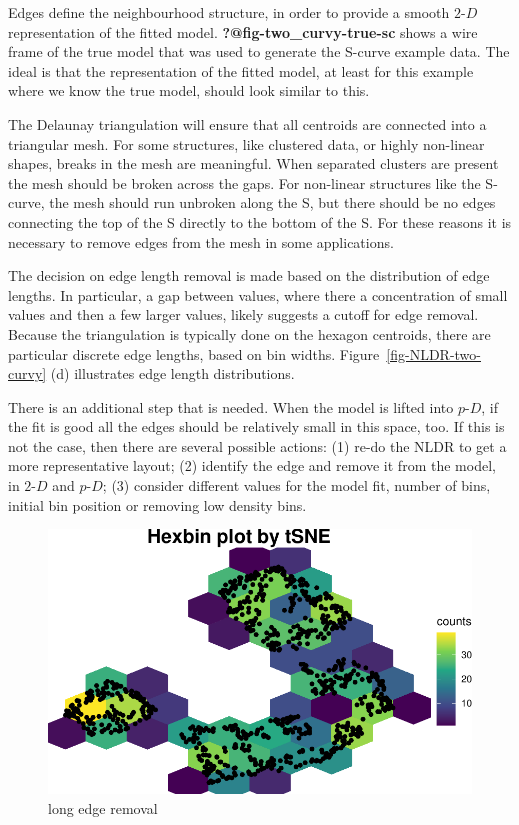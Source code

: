 \documentclass[
  12pt]{article}
\newcommand\pD{$p\text{-}D$}
\newcommand\gD{$2\text{-}D$}
\begin{document}
Edges define the neighbourhood structure, in order to provide a smooth
\gD{} representation of the fitted model.
\textbf{?@fig-two\_curvy-true-sc} shows a wire frame of the true model
that was used to generate the S-curve example data. The ideal is that
the representation of the fitted model, at least for this example where
we know the true model, should look similar to this.

The Delaunay triangulation will ensure that all centroids are connected
into a triangular mesh. For some structures, like clustered data, or
highly non-linear shapes, breaks in the mesh are meaningful. When
separated clusters are present the mesh should be broken across the
gaps. For non-linear structures like the S-curve, the mesh should run
unbroken along the S, but there should be no edges connecting the top of
the S directly to the bottom of the S. For these reasons it is necessary
to remove edges from the mesh in some applications.

The decision on edge length removal is made based on the distribution of
edge lengths. In particular, a gap between values, where there a
concentration of small values and then a few larger values, likely
suggests a cutoff for edge removal. Because the triangulation is
typically done on the hexagon centroids, there are particular discrete
edge lengths, based on bin widths. Figure~\ref{fig-NLDR-two-curvy} (d)
illustrates edge length distributions.

There is an additional step that is needed. When the model is lifted
into \pD{}, if the fit is good all the edges should be relatively small
in this space, too. If this is not the case, then there are several
possible actions: (1) re-do the NLDR to get a more representative
layout; (2) identify the edge and remove it from the model, in \gD{} and
\pD{}; (3) consider different values for the model fit, number of bins,
initial bin position or removing low density bins.

\begin{figure}[H]

{\centering \includegraphics[width=1\textwidth,height=\textheight]{paper_files/figure-pdf/unnamed-chunk-36-1.pdf}

}

\caption{long edge removal}

\end{figure}%
\end{document}
